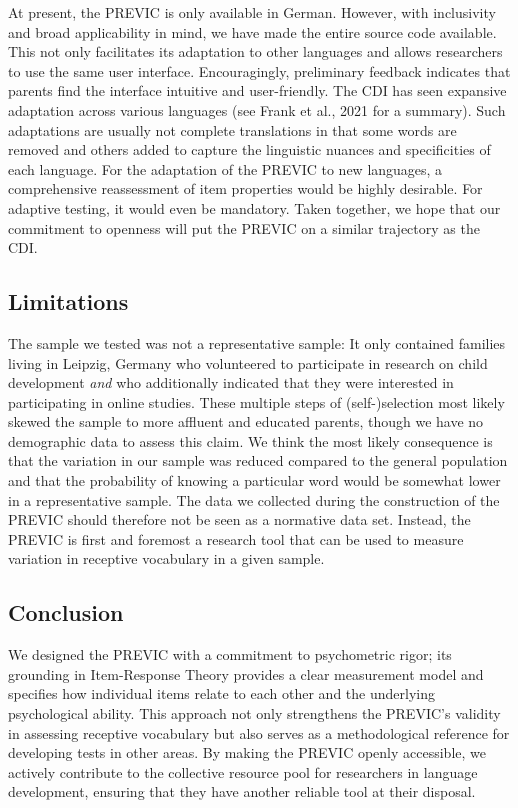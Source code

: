 \documentclass[
  man,floatsintext]{apa6}
\begin{document}
At present, the PREVIC is only available in German. However, with inclusivity and broad applicability in mind, we have made the entire source code available. This not only facilitates its adaptation to other languages and allows researchers to use the same user interface. Encouragingly, preliminary feedback indicates that parents find the interface intuitive and user-friendly. The CDI has seen expansive adaptation across various languages (see Frank et al., 2021 for a summary). Such adaptations are usually not complete translations in that some words are removed and others added to capture the linguistic nuances and specificities of each language. For the adaptation of the PREVIC to new languages, a comprehensive reassessment of item properties would be highly desirable. For adaptive testing, it would even be mandatory. Taken together, we hope that our commitment to openness will put the PREVIC on a similar trajectory as the CDI.

\hypertarget{limitations}{%
\subsection{Limitations}\label{limitations}}

The sample we tested was not a representative sample: It only contained families living in Leipzig, Germany who volunteered to participate in research on child development \emph{and} who additionally indicated that they were interested in participating in online studies. These multiple steps of (self-)selection most likely skewed the sample to more affluent and educated parents, though we have no demographic data to assess this claim. We think the most likely consequence is that the variation in our sample was reduced compared to the general population and that the probability of knowing a particular word would be somewhat lower in a representative sample. The data we collected during the construction of the PREVIC should therefore not be seen as a normative data set. Instead, the PREVIC is first and foremost a research tool that can be used to measure variation in receptive vocabulary in a given sample.

\hypertarget{conclusion}{%
\subsection{Conclusion}\label{conclusion}}

We designed the PREVIC with a commitment to psychometric rigor; its grounding in Item-Response Theory provides a clear measurement model and specifies how individual items relate to each other and the underlying psychological ability. This approach not only strengthens the PREVIC's validity in assessing receptive vocabulary but also serves as a methodological reference for developing tests in other areas. By making the PREVIC openly accessible, we actively contribute to the collective resource pool for researchers in language development, ensuring that they have another reliable tool at their disposal.
\end{document}
